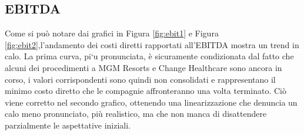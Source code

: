 \documentclass[12pt,a4paper,twoside]{report}
\begin{document}
\subsection{EBITDA}
Come si pu\`o notare dai grafici in Figura \ref{fig:ebit1} e Figura \ref{fig:ebit2},l’andamento dei costi 
diretti rapportati all'EBITDA mostra un trend in calo. 
La prima curva, pi`u pronunciata, \`e sicuramente condizionata dal fatto che alcuni dei procedimenti a 
MGM Resorts e Change Healthcare sono ancora in corso, i valori corrispondenti sono quindi non consolidati e rappresentano 
il minimo costo diretto che le compagnie affronteranno una volta terminato.
 Ci\`o viene corretto nel secondo grafico, ottenendo una linearizzazione che denuncia un calo meno pronunciato, pi\`u realistico,
ma che non manca di disattendere parzialmente le aspettative iniziali.\\
\captionsetup[subfigure]{list=true} 
\end{document}
